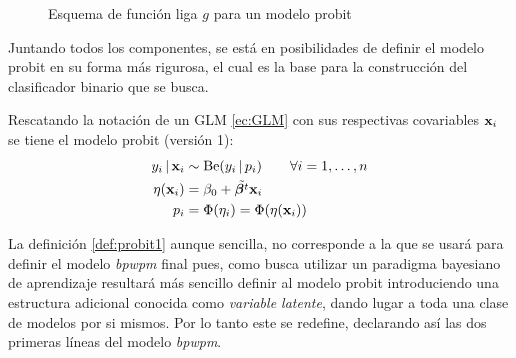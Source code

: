 \documentclass[../Main/Main.tex]{subfiles}
\begin{document}
\begin{figure}[h]
\centering
{}
\caption{Esquema de función liga $g$ para un modelo probit}
\label{fig:DiagramaFuncLiga}
\end{figure}

Juntando todos los componentes, se está en posibilidades de definir el modelo probit en su forma más rigurosa, el cual es la base para la construcción del clasificador binario que se busca.
\vfill
\pagebreak

\begin{definition} Rescatando la notación de un GLM \eqref{ec:GLM} con sus respectivas covariables $\mathbf{x}_i$ se tiene el modelo probit (versión 1): \label{def:probit1}
\begin{align}
y_i\,|\,\mathbf{x}_i & \sim \text{Be}(y_i\,|\,p_i) \qquad \forall i = 1,\ldots,n\label{ec:ModProbitA}\\
\eta(\mathbf{x}_i) &= \beta_0 + \tilde{\bm{\beta}^t}\mathbf{x}_i \label{ec:ModProbitB} \\
p_i &= \Phi(\eta_i) = \Phi(\eta(\mathbf{x}_i)) \label{ec:ModProbitC}
\end{align}
\end{definition}
La definición \ref{def:probit1} aunque sencilla, no corresponde a la que se usará para definir el modelo \textit{bpwpm} final pues, como busca utilizar un paradigma bayesiano de aprendizaje resultará más sencillo definir al modelo probit introduciendo una estructura adicional conocida como \textit{variable latente}, dando lugar a toda una clase de modelos por si mismos. Por lo tanto este se redefine, declarando así las dos primeras líneas del modelo \textit{bpwpm}.\\
\end{document}
